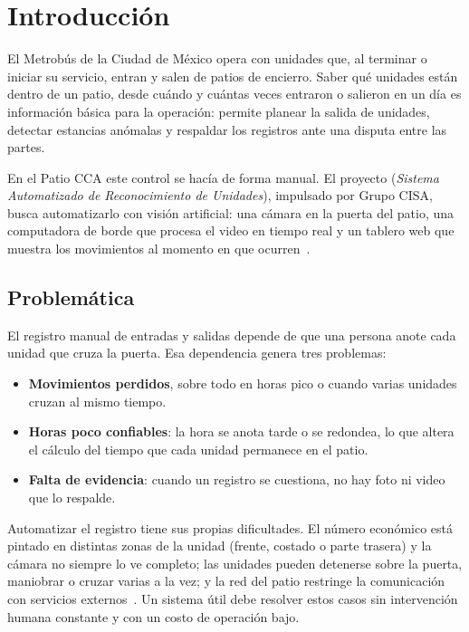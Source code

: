 \chapter{Introducción}
\label{cap:introduccion}

El Metrobús de la Ciudad de México opera con unidades que, al terminar o
iniciar su servicio, entran y salen de patios de encierro. Saber qué
unidades están dentro de un patio, desde cuándo y cuántas veces entraron o
salieron en un día es información básica para la operación: permite
planear la salida de unidades, detectar estancias anómalas y respaldar los
registros ante una disputa entre las partes.

En el Patio CCA este control se hacía de forma manual. El proyecto
\saru{} (\emph{Sistema Automatizado de Reconocimiento de Unidades}),
impulsado por Grupo CISA, busca automatizarlo con visión artificial: una
cámara en la puerta del patio, una computadora de borde que procesa el
video en tiempo real y un tablero web que muestra los movimientos al
momento en que ocurren~\cite{act1}.

\section{Problemática}
\label{sec:problematica}

El registro manual de entradas y salidas depende de que una persona anote
cada unidad que cruza la puerta. Esa dependencia genera tres problemas:

\begin{itemize}
  \item \textbf{Movimientos perdidos}, sobre todo en horas pico o cuando
        varias unidades cruzan al mismo tiempo.
  \item \textbf{Horas poco confiables}: la hora se anota tarde o se
        redondea, lo que altera el cálculo del tiempo que cada unidad
        permanece en el patio.
  \item \textbf{Falta de evidencia}: cuando un registro se cuestiona, no hay
        foto ni video que lo respalde.
\end{itemize}

Automatizar el registro tiene sus propias dificultades. El número
económico está pintado en distintas zonas de la unidad (frente, costado o
parte trasera) y la cámara no siempre lo ve completo; las unidades pueden
detenerse sobre la puerta, maniobrar o cruzar varias a la vez; y la red del
patio restringe la comunicación con servicios externos~\cite{rep-envivo}.
Un sistema útil debe resolver estos casos sin intervención humana
constante y con un costo de operación bajo.

